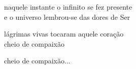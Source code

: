 naquele instante o infinito se fez presente\\
e o universo lembrou-se das dores de Ser

lágrimas vivas tocaram aquele coração\\
cheio de compaixão

cheio de compaixão...

